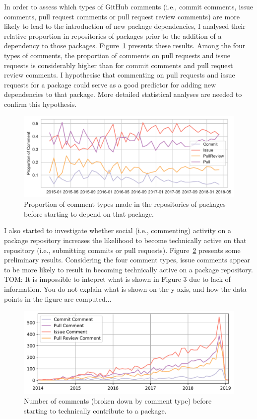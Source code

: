 In order to assess which types of GitHub comments (i.e., commit comments, issue comments, pull request comments or pull request review comments) are more likely to lead to the introduction of new package dependencies, I analysed their relative proportion in repositories of packages prior to the addition of a dependency to those packages. Figure~\ref{fig:fig2} presents these results. 
Among the four types of comments, the proportion of comments on pull requests and issue requests is considerably higher than for commit comments and pull request review comments. I hypothesise that commenting on pull requests and issue requests for a package could serve as a good predictor for adding new dependencies to that package. More detailed statistical analyses are needed to confirm this hypothesis.

\begin{figure}[htb]
    \includegraphics[width=0.95\columnwidth]{Photos/RQ22.pdf} 
    \caption{Proportion of comment types made in the repositories of packages before starting to depend on that package.}
    \label{fig:fig2}
\end{figure}

I also started to investigate whether social (i.e., commenting) activity on a package repository increases the likelihood to become technically active on that repository (i.e., submitting commits or pull requests). 
Figure~\ref{fig:fig3} presents some preliminary results. Considering the four comment types, issue comments appear to be more likely to result in becoming technically active on a package repository.
{\color{red}TOM: It is impossible to intepret what is shown in Figure 3 due to lack of information. You do not explain what is shown on the y axis, and how the data points  in the figure are computed...}
\begin{figure}[thb]
    \includegraphics[width=0.95\columnwidth]{Photos/RQ3.pdf} 
    \caption{Number of comments (broken down by comment type) before starting  to technically contribute to a package.}
    \label{fig:fig3}
\end{figure}


